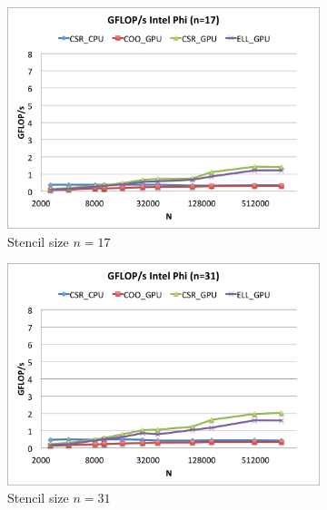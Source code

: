\documentclass{report}
\begin{document}
\begin{figure} 
\centering
\begin{subfigure}[t]{0.48\textwidth}
\centering
\includegraphics[width=\textwidth]{gpu_content/cascade_spmv/gflops_cascade_intel_phi_n17.png}
\caption{Stencil size $n=17$}
\end{subfigure}
\quad
\begin{subfigure}[t]{0.48\textwidth}
\centering
\includegraphics[width=\textwidth]{gpu_content/cascade_spmv/gflops_cascade_intel_phi_n31.png}
\caption{Stencil size $n=31$}
\end{subfigure}
\begin{subfigure}[t]{0.48\textwidth}
\centering

\end{subfigure}
\end{figure}
\end{document}
